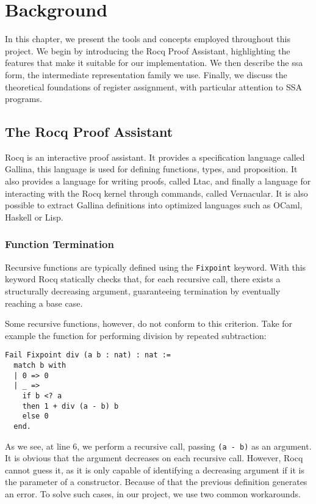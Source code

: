
\chapter{Background}
\label{cha:background}

In this chapter, we present the tools and concepts employed throughout this project. We begin by introducing the Rocq Proof Assistant, highlighting the features that make it suitable for our implementation. We then describe the \gls{ssa} form, the intermediate representation family we use. Finally, we discuss the theoretical foundations of register assignment, with particular attention to SSA programs.

\section{The Rocq Proof Assistant}

Rocq is an interactive proof assistant. It provides a specification language called Gallina, this language is used for defining functions, types, and proposition. It also provides a language for writing proofs, called Ltac, and finally a language for interacting with the Rocq kernel through commands, called Vernacular. It is also possible to extract Gallina definitions into optimized languages such as OCaml, Haskell or Lisp.

\subsection{Function Termination}
\label{subsec:funterm}

Recursive functions are typically defined using the \texttt{Fixpoint} keyword. With this keyword Rocq statically checks that, for each recursive call, there exists a structurally decreasing argument, guaranteeing termination by eventually reaching a base case.

Some recursive functions, however, do not conform to this criterion. Take for example the function for performing division by repeated subtraction:

\begin{lstlisting}[style=Rocq]
Fail Fixpoint div (a b : nat) : nat :=
  match b with
  | 0 => 0
  | _ =>
    if b <? a
    then 1 + div (a - b) b
    else 0
  end.
\end{lstlisting}

As we see, at line 6, we perform a recursive call, passing \texttt{(a - b)} as an argument. It is obvious that the argument decreases on each recursive call. However, Rocq cannot guess it, as it is only capable of identifying a decreasing argument if it is the parameter of a constructor. Because of that the previous definition generates an error.
To solve such cases, in our project, we use two common workarounds.


